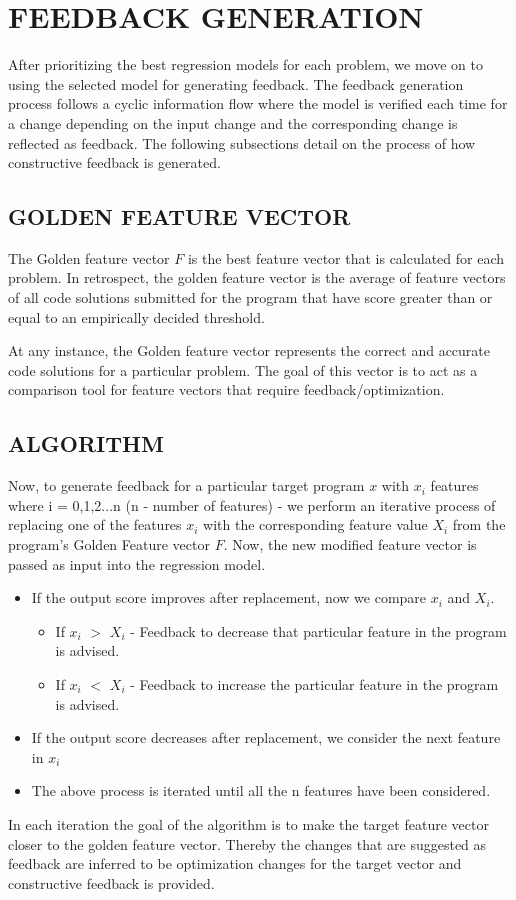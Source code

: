 
\chapter{FEEDBACK GENERATION}

After prioritizing the best regression models for each problem, we move on to using the selected model for generating feedback. The feedback generation process follows a cyclic information flow where the model is verified each time for a change depending on the input change and the corresponding change is reflected as feedback. The following subsections detail on the process of how constructive feedback is generated. 

\section{GOLDEN FEATURE VECTOR}

    The Golden feature vector $F$ is the best feature vector that is calculated for each problem. In retrospect, the golden feature vector is the average of feature vectors of all code solutions submitted for the program that have score greater than or equal to an empirically decided threshold. 

At any instance, the Golden feature vector represents the correct and accurate code solutions for a particular problem. The goal of this vector is to act as a comparison tool for feature vectors that require feedback/optimization. 

\section{ALGORITHM}

Now, to generate feedback for a particular target program $x$ with $x_{i}$ features where i = 0,1,2...n (n - number of features) - we perform an iterative process of replacing one of the features $x_{i}$ with the corresponding feature value $X_{i}$ from the program's Golden Feature vector $F$. Now, the new modified feature vector is passed as input into the regression model. 

\begin{itemize}

    \item If the output score improves after replacement, now we compare $x_{i}$ and $X_{i}$.

        \begin{itemize}
                \item If $x_{i}$ $>$ $X_{i}$ - Feedback to decrease that particular feature in the program is advised. 
                \item If $x_{i}$ $<$ $X_{i}$ - Feedback to increase the particular feature in the program is advised.
        \end{itemize}
        
    \item If the output score decreases after replacement, we consider the next feature in $x_{i}$
    
    \item The above process is iterated until all the n features have been considered. 

\end{itemize}

In each iteration the goal of the algorithm is to make the target feature vector closer to the golden feature vector. Thereby the changes that are suggested as feedback are inferred to be optimization changes for the target vector and constructive feedback is provided. 
